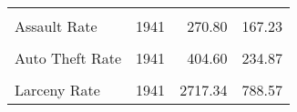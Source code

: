 \begin{table}[!h]
\begin{tabular}[t]{lrrr}
\hspace{1em}\cellcolor{gray!6}{Rape Rate} & \cellcolor{gray!6}{1941} & \cellcolor{gray!6}{32.33} & \cellcolor{gray!6}{14.52}\\
\hspace{1em}Assault Rate & 1941 & 270.80 & 167.23\\
\hspace{1em}\cellcolor{gray!6}{Robbery Rate} & \cellcolor{gray!6}{1941} & \cellcolor{gray!6}{148.48} & \cellcolor{gray!6}{160.60}\\
\hspace{1em}Auto Theft Rate & 1941 & 404.60 & 234.87\\
\hspace{1em}\cellcolor{gray!6}{Burglary Rate} & \cellcolor{gray!6}{1941} & \cellcolor{gray!6}{1046.53} & \cellcolor{gray!6}{429.72}\\
\hspace{1em}Larceny Rate & 1941 & 2717.34 & 788.57\\
\bottomrule
\end{tabular}
\end{table}
